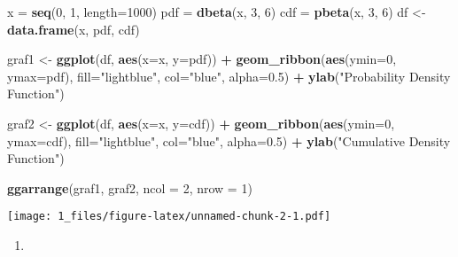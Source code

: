 \documentclass[
]{article}
\newenvironment{Shaded}{\begin{snugshade}}{\end{snugshade}}
\newcommand{\DataTypeTok}[1]{\textcolor[rgb]{0.13,0.29,0.53}{#1}}
\newcommand{\DecValTok}[1]{\textcolor[rgb]{0.00,0.00,0.81}{#1}}
\newcommand{\FloatTok}[1]{\textcolor[rgb]{0.00,0.00,0.81}{#1}}
\newcommand{\KeywordTok}[1]{\textcolor[rgb]{0.13,0.29,0.53}{\textbf{#1}}}
\newcommand{\NormalTok}[1]{#1}
\newcommand{\OperatorTok}[1]{\textcolor[rgb]{0.81,0.36,0.00}{\textbf{#1}}}
\newcommand{\StringTok}[1]{\textcolor[rgb]{0.31,0.60,0.02}{#1}}
\begin{document}
\begin{Shaded}
\begin{Highlighting}[]
\NormalTok{x =}\StringTok{ }\KeywordTok{seq}\NormalTok{(}\DecValTok{0}\NormalTok{, }\DecValTok{1}\NormalTok{, }\DataTypeTok{length=}\DecValTok{1000}\NormalTok{)}
\NormalTok{pdf =}\StringTok{ }\KeywordTok{dbeta}\NormalTok{(x, }\DecValTok{3}\NormalTok{, }\DecValTok{6}\NormalTok{)}
\NormalTok{cdf =}\StringTok{ }\KeywordTok{pbeta}\NormalTok{(x, }\DecValTok{3}\NormalTok{, }\DecValTok{6}\NormalTok{)}
\NormalTok{df <-}\StringTok{ }\KeywordTok{data.frame}\NormalTok{(x, pdf, cdf)}

\NormalTok{graf1 <-}\StringTok{ }\KeywordTok{ggplot}\NormalTok{(df, }\KeywordTok{aes}\NormalTok{(}\DataTypeTok{x=}\NormalTok{x, }\DataTypeTok{y=}\NormalTok{pdf)) }\OperatorTok{+}
\StringTok{  }\KeywordTok{geom_ribbon}\NormalTok{(}\KeywordTok{aes}\NormalTok{(}\DataTypeTok{ymin=}\DecValTok{0}\NormalTok{, }\DataTypeTok{ymax=}\NormalTok{pdf), }\DataTypeTok{fill=}\StringTok{"lightblue"}\NormalTok{, }\DataTypeTok{col=}\StringTok{"blue"}\NormalTok{, }\DataTypeTok{alpha=}\FloatTok{0.5}\NormalTok{) }\OperatorTok{+}
\StringTok{  }\KeywordTok{ylab}\NormalTok{(}\StringTok{"Probability Density Function"}\NormalTok{)}

\NormalTok{graf2 <-}\StringTok{ }\KeywordTok{ggplot}\NormalTok{(df, }\KeywordTok{aes}\NormalTok{(}\DataTypeTok{x=}\NormalTok{x, }\DataTypeTok{y=}\NormalTok{cdf)) }\OperatorTok{+}
\StringTok{  }\KeywordTok{geom_ribbon}\NormalTok{(}\KeywordTok{aes}\NormalTok{(}\DataTypeTok{ymin=}\DecValTok{0}\NormalTok{, }\DataTypeTok{ymax=}\NormalTok{cdf), }\DataTypeTok{fill=}\StringTok{"lightblue"}\NormalTok{, }\DataTypeTok{col=}\StringTok{"blue"}\NormalTok{, }\DataTypeTok{alpha=}\FloatTok{0.5}\NormalTok{) }\OperatorTok{+}
\StringTok{  }\KeywordTok{ylab}\NormalTok{(}\StringTok{"Cumulative Density Function"}\NormalTok{)}

\KeywordTok{ggarrange}\NormalTok{(graf1, graf2, }
          \DataTypeTok{ncol =} \DecValTok{2}\NormalTok{, }\DataTypeTok{nrow =} \DecValTok{1}\NormalTok{)}
\end{Highlighting}
\end{Shaded}

\texttt{[image: 1\_files/figure-latex/unnamed-chunk-2-1.pdf]}

\begin{enumerate}
\def\labelenumi{\alph{enumi})}
\setcounter{enumi}{1}
\item
\end{enumerate}
\end{document}
